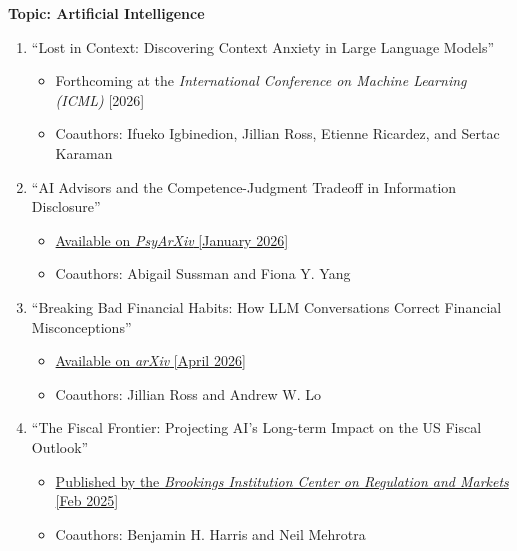\documentclass[11pt]{article}
\begin{document}
{\bf Topic: Artificial Intelligence} \\
\vspace*{-.2in}
\begin{enumerate}

\item ``Lost in Context: Discovering Context Anxiety in Large Language Models''
\begin{itemize}
\vspace*{-.07in}
	\item Forthcoming at the {\it International Conference on Machine Learning (ICML)} [2026]
\vspace*{-.07in}
	\item Coauthors: Ifueko Igbinedion, Jillian Ross, Etienne Ricardez, and Sertac Karaman
\end{itemize}
\vskip 0.24cm

\item ``AI Advisors and the Competence-Judgment Tradeoff in Information Disclosure''
\begin{itemize}
\vspace*{-.07in}
	\item \href{https://osf.io/preprints/psyarxiv/sejdg_v1}{Available on {\it PsyArXiv} [January 2026]}
\vspace*{-.07in}
	\item Coauthors: Abigail Sussman and Fiona Y. Yang
\end{itemize}
\vskip 0.24cm

\item ``Breaking Bad Financial Habits: How LLM Conversations Correct Financial Misconceptions''
\begin{itemize}
\vspace*{-.07in}
	\item \href{https://arxiv.org/abs/2604.27022}{Available on {\it arXiv} [April 2026]}
\vspace*{-.07in}
	\item Coauthors: Jillian Ross and Andrew W. Lo
\end{itemize}
\vskip 0.24cm

\item ``The Fiscal Frontier: Projecting AI's Long-term Impact on the US Fiscal Outlook''
\begin{itemize}
\vspace*{-.07in}
	\item \href{https://www.brookings.edu/articles/the-fiscal-frontier-projecting-ais-long-term-impact-on-the-us-fiscal-outlook/}{Published by the {\it Brookings Institution Center on Regulation and Markets} [Feb 2025]}
\vspace*{-.07in}
	\item Coauthors: Benjamin H. Harris and Neil Mehrotra
\end{itemize}

\end{enumerate}
\end{document}
